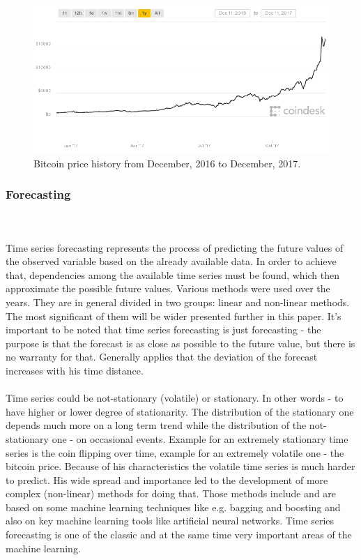 \documentclass[runningheads,a4paper]{llncs}[2015/06/24]
\begin{document}
\begin{figure}[h]
\centering
\includegraphics[width=\textwidth]{bitcoin}
\caption{Bitcoin price history from December,  2016 to December, 2017.}
\label{fig:bitcoin}
\end{figure}

		\subsubsection{Forecasting} \hspace{1cm}\\\\Time series forecasting represents the process of predicting the future values of the observed variable based on the already available data. In order to achieve that, dependencies among the available time series must be found, which then approximate the possible future values. Various methods were used over the years. They are in general divided  in two groups: linear and non-linear methods. The most significant of them will be wider presented  further in this paper. It's important to be noted that time series forecasting is just forecasting - the purpose is that the forecast is as close as possible to the future value, but there is no warranty for that. Generally applies that the deviation of the forecast increases with his time distance.\\\\ 

Time series could be not-stationary (volatile) or stationary. In other words - to have higher or lower degree of stationarity. The distribution of the stationary one depends much more on a long term trend while the distribution of the not-stationary one - on occasional events. Example for an extremely stationary time series is the coin flipping over time, example for an extremely volatile one - the bitcoin price. Because of his characteristics the volatile time series is much harder to predict. His wide spread and importance led to the development of more complex (non-linear) methods for doing that. Those methods include and are based on some machine learning techniques like e.g. bagging and boosting and also on key machine learning tools like artificial neural networks. Time series forecasting is one of the classic and at the same time very important areas of the machine learning.
\end{document}
